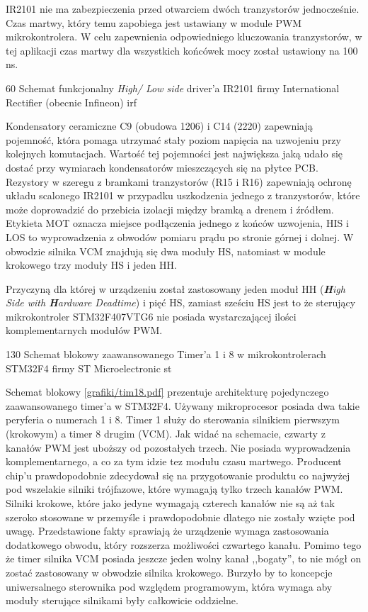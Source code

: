 IR2101 nie ma zabezpieczenia przed otwarciem dwóch tranzystorów jednocześnie. Czas martwy, który temu zapobiega jest ustawiany w module PWM mikrokontrolera. W celu zapewnienia odpowiedniego kluczowania tranzystorów, w tej aplikacji czas martwy dla wszystkich końcówek mocy został ustawiony na 100 ns.

	{60}
	{Schemat funkcjonalny {\it High/ Low side} driver'a IR2101 firmy International Rectifier (obecnie Infineon)}
	{irf}
	
Kondensatory ceramiczne C9 (obudowa 1206) i C14 (2220) zapewniają pojemność, która pomaga utrzymać stały poziom napięcia na uzwojeniu przy kolejnych komutacjach. Wartość tej pojemności jest największa jaką udało się dostać przy wymiarach kondensatorów mieszczących się na płytce PCB. Rezystory w szeregu z bramkami tranzystorów (R15 i R16) zapewniają ochronę układu scalonego IR2101 w przypadku uszkodzenia jednego z tranzystorów, które może doprowadzić do przebicia izolacji między bramką a drenem i źródłem. Etykieta MOT oznacza miejsce podłączenia jednego z końców uzwojenia, HIS i LOS to wyprowadzenia z obwodów pomiaru prądu po stronie górnej i dolnej. W obwodzie silnika VCM znajdują się dwa moduły HS, natomiast w module krokowego trzy moduły HS i jeden HH.


Przyczyną dla której w urządzeniu został zastosowany jeden moduł HH (\textit{\textbf{H}igh Side with \textbf{H}ardware Deadtime}) i pięć HS, zamiast sześciu HS jest to że sterujący mikrokontroler STM32F407VTG6 nie posiada wystarczającej ilości komplementarnych modułów PWM.

	{130}
	{Schemat blokowy zaawansowanego Timer'a 1 i 8 w mikrokontrolerach STM32F4 firmy ST Microelectronic}
	{st}

Schemat blokowy \ref{grafiki/tim18.pdf} prezentuje architekturę pojedynczego zaawansowanego timer'a w STM32F4. Używany mikroprocesor posiada dwa takie peryferia o numerach 1 i 8. Timer 1 służy do sterowania silnikiem pierwszym (krokowym) a timer 8 drugim (VCM). Jak widać na schemacie, czwarty z kanałów PWM jest uboższy od pozostałych trzech. Nie posiada wyprowadzenia komplementarnego, a co za tym idzie tez modułu czasu martwego. Producent chip'u prawdopodobnie zdecydował się na przygotowanie produktu co najwyżej pod wszelakie silniki trójfazowe, które wymagają tylko trzech kanałów PWM. Silniki krokowe, które jako jedyne wymagają czterech kanałów nie są aż tak szeroko stosowane w przemyśle i prawdopodobnie dlatego nie zostały wzięte pod uwagę. Przedstawione fakty sprawiają że urządzenie wymaga zastosowania dodatkowego obwodu, który rozszerza możliwości czwartego kanału. Pomimo tego że timer silnika VCM posiada jeszcze jeden wolny kanał ,,bogaty'', to nie mógł on zostać zastosowany w obwodzie silnika krokowego. Burzyło by to koncepcje uniwersalnego sterownika pod względem programowym, która wymaga aby moduły sterujące silnikami były całkowicie oddzielne.

